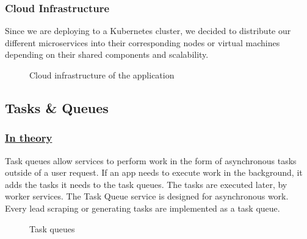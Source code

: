 \subsubsection{Cloud Infrastructure}
Since we are deploying to a Kubernetes cluster, we decided to distribute our different microservices into their corresponding nodes or virtual machines depending on their shared components and scalability.
\begin{figure}[H]
	\centering
	\caption{Cloud infrastructure of the application}
	\label{fig:cloud-infrastructure}
\end{figure}

\subsection{Tasks \& Queues}

\subsubsection*{\underline{In theory}}
Task queues allow services to perform work in the form of asynchronous tasks outside of a user request.
If an app needs to execute work in the background, it adds the tasks it needs to the task queues. The tasks are executed later, by worker services. The Task Queue service is designed for asynchronous work.
Every lead scraping or generating tasks are implemented as a task queue.
\begin{figure}[H]
	\centering
	\caption{Task queues}
	\label{fig:task-queue}
\end{figure}

